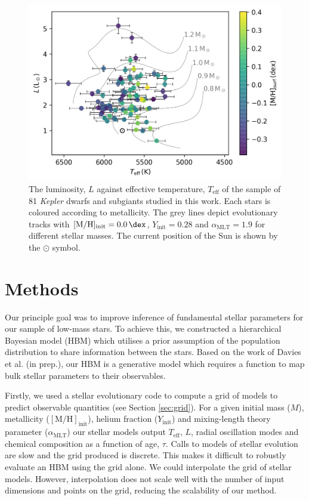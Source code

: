 \documentclass[a4paper,fleqn,usenatbib]{mnras}
\newcommand{\metallicity}{\ensuremath{[\mathrm{M}/\mathrm{H}]}}
\newcommand{\teff}{\ensuremath{T_\mathrm{eff}}}
\newcommand{\mlt}{\ensuremath{{\alpha_\mathrm{MLT}}}}
\begin{document}
\begin{figure}
    \centering
    \includegraphics[width=\linewidth]{figures/context.png}
    \caption{The luminosity, $L$ against effective temperature, $\teff$ of the sample of 81 \emph{Kepler} dwarfs and subgiants studied in this work. Each stars is coloured according to metallicity. The grey lines depict evolutionary tracks with $\metallicity_\mathrm{init}=\SI{0.0}{\dex}$, $Y_\mathrm{init}=0.28$ and $\mlt=1.9$ for different stellar masses. The current position of the Sun is shown by the $\odot$ symbol.}
    \label{fig:data}
\end{figure}

\section{Methods}\label{sec:meth}

Our principle goal was to improve inference of fundamental stellar parameters for our sample of low-mass stars. To achieve this, we constructed a hierarchical Bayesian model (HBM) which utilises a prior assumption of the population distribution to share information between the stars. Based on the work of Davies et al. (in prep.), our HBM is a generative model which requires a function to map bulk stellar parameters to their observables.

Firstly, we used a stellar evolutionary code to compute a grid of models to predict observable quantities (see Section \ref{sec:grid}). For a given initial mass ($M$), metallicity ($\metallicity_\mathrm{init}$), helium fraction ($Y_\mathrm{init}$) and mixing-length theory parameter ($\mlt$) our stellar models output $\teff$, $L$, radial oscillation modes and chemical composition as a function of age, $\tau$. Calls to models of stellar evolution are slow and the grid produced is discrete. This makes it difficult to robustly evaluate an HBM using the grid alone. We could interpolate the grid of stellar models. However, interpolation does not scale well with the number of input dimensions and points on the grid, reducing the scalability of our method.
\end{document}
